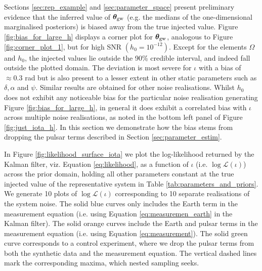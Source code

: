 \documentclass[fleqn,usenatbib,useAMS]{mnras}
\begin{document}
Sections \ref{sec:rep_example} and \ref{sec:parameter_space} present preliminary evidence that the inferred value of ${\boldsymbol{\theta}}_{\rm gw}$ (e.g. the medians of the one-dimensional marginalised posteriors) is biased away from the true injected value. Figure \ref{fig:bias_for_large_h} displays a corner plot for $\boldsymbol{\theta}_{\rm gw}$, analogous to Figure \ref{fig:corner_plot_1}, but for high SNR $(h_0 = 10^{-12})$. Except for the elements $\Omega$ and $h_0$, the injected values lie outside the 90\% credible interval, and indeed fall outside the plotted domain. The deviation is most severe for $\iota$ with a bias of $\approx 0.3$ rad but is also present to a lesser extent in other static parameters such as $\delta,\alpha$ and $\psi$. Similar results are obtained for other noise realisations. Whilst $h_0$ does not exhibit any noticeable bias for the particular noise realisation generating Figure \ref{fig:bias_for_large_h}, in general it does exhibit a correlated bias with $\iota$ across multiple noise realisations, as noted in the bottom left panel of Figure \ref{fig:just_iota_h}. In this section we demonstrate how the bias stems from dropping the pulsar terms described in Section \ref{sec:parameter_estim}. \newline 


In Figure \ref{fig:likelihood_surface_iota} we plot the log-likelihood returned by the Kalman filter, viz. Equation \eqref{eq:likelihood}, as a function of $\iota$ (i.e. $\log \mathcal{L}(\iota)$) across the prior domain, holding all other parameters constant at the true injected value of the representative system in Table \ref{tab:parameters_and_priors}. We generate 10 plots of $\log \mathcal{L}(\iota)$ corresponding to 10 separate realisations of the system noise. The solid blue curves only includes the Earth term in the measurement equation (i.e. using Equation \eqref{eq:measuremen_earth} in the Kalman filter). The solid orange curves include the Earth and pulsar terms in the measurement equation (i.e. using Equation \eqref{eq:measurement}). The solid green curve corresponds to a control experiment, where we drop the pulsar terms from both the synthetic data and the measurement equation. The vertical dashed lines mark the corresponding maxima, which nested sampling seeks. \newline  
\end{document}
